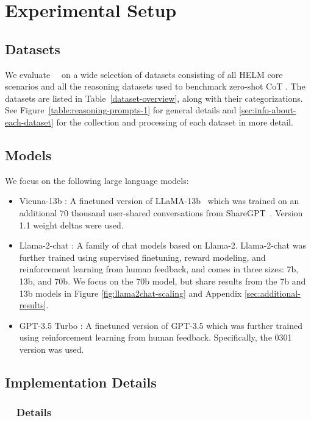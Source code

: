 \section{Experimental Setup}
\label{sec:main-experimental-setup}
\subsection{Datasets}
We evaluate \zeroshotmid\ \method\ on a wide selection of datasets consisting of all HELM core scenarios \citep{liang2022holistic} and all the reasoning datasets used to benchmark zero-shot CoT \citep{kojima2023large}. The datasets are listed in Table~\ref{dataset-overview}, along with their categorizations. See Figure~\ref{table:reasoning-prompts-1} for general details and \ref{sec:info-about-each-dataset} for the collection and processing of each dataset in more detail.

\subsection{Models} 
\label{sec:models}
We focus on the following large language models:
\begin{itemize}
    \item Vicuna-13b \citep{vicuna2023}: A finetuned version of LLaMA-13b~\citep{touvron2023llama} which was trained on an additional 70 thousand user-shared conversations from ShareGPT~\citep{sharegpt}. Version 1.1 weight deltas were used.
    \item Llama-2-chat \citep{touvron2023llama2}: A family of chat models based on Llama-2. Llama-2-chat was further trained using supervised finetuning, reward modeling, and reinforcement learning from human feedback, and comes in three sizes: 7b, 13b, and 70b. We focus on the 70b model, but share results from the 7b and 13b models in Figure \ref{fig:llama2chat-scaling} and Appendix \ref{sec:additional-results}.
    \item GPT-3.5 Turbo \citep{openaichatgpt}: A finetuned version of GPT-3.5 which was further trained using reinforcement learning from human feedback. Specifically, the 0301 version was used.
\end{itemize}

\subsection{Implementation Details}
\label{sec:implementation-details}

\subsubsection{\zeroshotcap\ \method\ Details}
